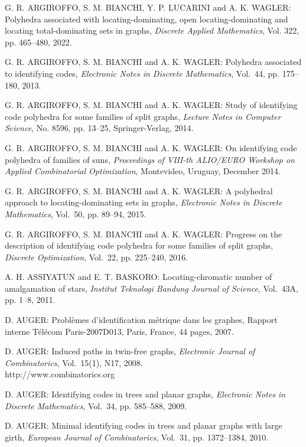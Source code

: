 \begin{thebibliography}{999}
G. R. ARGIROFFO, S. M. BIANCHI, Y. P. LUCARINI and A. K. WAGLER: Polyhedra associated with locating-dominating, open locating-dominating and locating total-dominating sets in graphs, {\it Discrete Applied Mathematics}, Vol. 322, pp. 465--480, 2022.

G. R. ARGIROFFO, S. M. BIANCHI and A. K. WAGLER: Polyhedra associated to identifying codes, {\it Electronic Notes in Discrete Mathematics}, Vol.~44, pp. 175--180, 2013.

G. R. ARGIROFFO, S. M. BIANCHI and A. K. WAGLER: Study of identifying code polyhedra for some families of split graphs, {\it Lecture Notes in Computer Science}, No. 8596, pp. 13--25, Springer-Verlag, 2014.

G. R. ARGIROFFO, S. M. BIANCHI and A. K. WAGLER: On identifying code polyhedra of families of suns, {\it Proceedings of VIII-th ALIO/EURO Workshop on Applied Combinatorial Optimization}, Montevideo, Uruguay, December 2014.

G. R. ARGIROFFO, S. M. BIANCHI and A. K. WAGLER: A polyhedral approach to locating-dominating sets in graphs, {\it Electronic Notes in Discrete Mathematics},  Vol.~50, pp. 89--94, 2015. 

G. R. ARGIROFFO, S. M. BIANCHI and A. K. WAGLER: Progress on the description of identifying code polyhedra for some families of split graphs, {\it Discrete Optimization}, Vol.~22, pp. 225--240,  2016.

A. H. ASSIYATUN and E. T. BASKORO: Locating-chromatic number of amalgamation of stars, {\it Institut Teknologi Bandung Journal of Science}, Vol.~43A, pp. 1--8, 2011.

D. AUGER: Probl\`emes d'identification m\'etrique dans les graphes, Rapport interne T\'el\'ecom Paris-2007D013, Paris, France, 44 pages, 2007.

D. AUGER: Induced paths in twin-free graphs, {\it Electronic Journal of Combinatorics}, Vol.~15(1), N17, 2008.\\
http://www.combinatorics.org

D. AUGER: Identifying codes in trees and planar graphs, {\it Electronic Notes in Discrete Mathematics}, Vol.~34, pp. 585--588, 2009.

D. AUGER: Minimal identifying codes in trees and planar graphs with large girth, {\it European Journal of Combinatorics}, Vol.~31, pp. 1372--1384, 2010.


\end{thebibliography}
